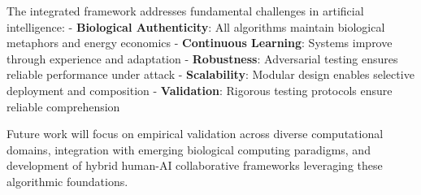 \documentclass[12pt,a4paper]{article}
\begin{document}
The integrated framework addresses fundamental challenges in artificial intelligence:
- \textbf{Biological Authenticity}: All algorithms maintain biological metaphors and energy economics
- \textbf{Continuous Learning}: Systems improve through experience and adaptation
- \textbf{Robustness}: Adversarial testing ensures reliable performance under attack
- \textbf{Scalability}: Modular design enables selective deployment and composition
- \textbf{Validation}: Rigorous testing protocols ensure reliable comprehension

Future work will focus on empirical validation across diverse computational domains, integration with emerging biological computing paradigms, and development of hybrid human-AI collaborative frameworks leveraging these algorithmic foundations.


\end{document}

